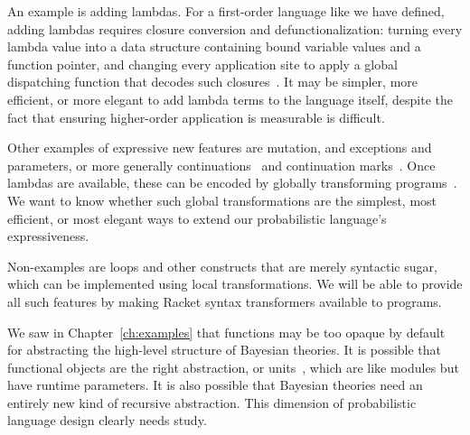 An example is adding lambdas.
For a first-order language like we have defined, adding lambdas requires closure conversion and defunctionalization: turning every lambda value into a data structure containing bound variable values and a function pointer, and changing every application site to apply a global dispatching function that decodes such closures~\cite{cit:danvy-2001-defunctionalization}.
It may be simpler, more efficient, or more elegant to add lambda terms to the language itself, despite the fact that ensuring higher-order application is measurable is difficult.

Other examples of expressive new features are mutation, and exceptions and parameters, or more generally continuations~\cite{cit:staram-1990-control} and continuation marks~\cite{cit:clements-2006diss}.
Once lambdas are available, these can be encoded by globally transforming programs~\cite{cit:danvy-2007-one-pass-cps,cit:germane-ms-thesis}.
We want to know whether such global transformations are the simplest, most efficient, or most elegant ways to extend our probabilistic language's expressiveness.

Non-examples are loops and other constructs that are merely syntactic sugar, which can be implemented using local transformations.
We will be able to provide all such features by making Racket syntax transformers available to programs.

We saw in Chapter~\ref{ch:examples} that functions may be too opaque by default for abstracting the high-level structure of Bayesian theories.
It is possible that functional objects are the right abstraction, or units~\cite{cit:findler-1998icfp-units}, which are like modules but have runtime parameters.
It is also possible that Bayesian theories need an entirely new kind of recursive abstraction.
This dimension of probabilistic language design clearly needs study.

